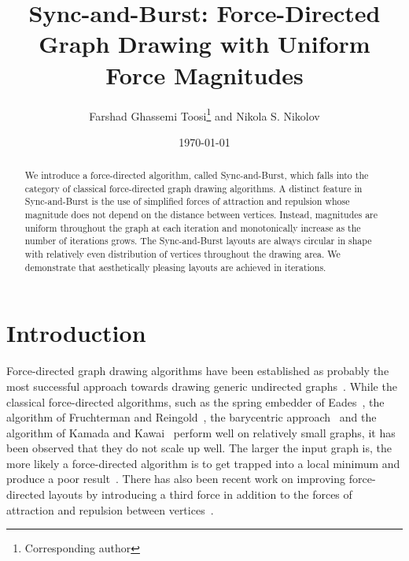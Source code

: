 \documentclass{llncs}
\begin{document}
\title{Sync-and-Burst: Force-Directed Graph Drawing with Uniform Force Magnitudes}

\author{Farshad Ghassemi Toosi\thanks{Corresponding author} and Nikola S. Nikolov}

\date{\today}

\maketitle

\begin{abstract}
We introduce a force-directed algorithm, called Sync-and-Burst, which falls into the category of classical force-directed graph drawing algorithms. A distinct feature in Sync-and-Burst is the use of simplified forces of attraction and repulsion whose magnitude does not depend on the distance between vertices. Instead, magnitudes are uniform throughout the graph at each iteration and monotonically increase as the number of iterations grows. The Sync-and-Burst layouts are always circular in shape with relatively even distribution of vertices throughout the drawing area. We demonstrate that aesthetically pleasing layouts are achieved in  iterations.
\end{abstract}

\section{Introduction}\label{sec:introduction}

Force-directed graph drawing algorithms have been established as probably the most successful approach towards drawing generic undirected graphs~\cite{Eades2010}. While the classical force-directed algorithms, such as the spring embedder of Eades~\cite{Eades1984}, the algorithm of Fruchterman and Reingold~\cite{FruRei1991}, the barycentric approach~\cite{Tutte1963,DETT1999} and the algorithm of Kamada and Kawai~\cite{KamKaw1989} perform well on relatively small graphs, it has been observed that they do not scale up well. The larger the input graph is, the more likely a force-directed algorithm is to get trapped into a local minimum and produce a poor result~\cite{Kobourov2013}. There has also been recent work on improving force-directed layouts by introducing a third force in addition to the forces of attraction and repulsion between vertices~\cite{BanEppGooTro2013}.
\end{document}
